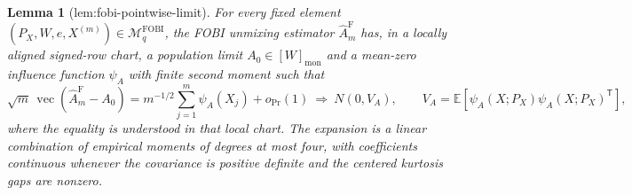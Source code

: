 \documentclass{article}
\newtheorem{lemma}{Lemma}
\begin{document}
\begin{lemma}[lem:fobi-pointwise-limit]\label{lem:fobi-pointwise-limit}
For every fixed element \((P_X,W,e,X^{(m)})\in\mathcal M_q^{\mathrm{FOBI}}\), the FOBI unmixing estimator \(\widehat A_m^{\mathrm F}\) has, in a locally aligned signed-row chart, a population limit \(A_0\in[W]_{\mathrm{mon}}\) and a mean-zero influence function \(\psi_A\) with finite second moment such that
\[
 \sqrt m\,\operatorname{vec}(\widehat A_m^{\mathrm F}-A_0)
 =m^{-1/2}\sum_{j=1}^m\psi_A(X_j)+o_{\Pr}(1)
 \ \Longrightarrow\ N(0,V_A),
 \qquad
 V_A=\mathbb E[\psi_A(X;P_X)\psi_A(X;P_X)^{\mathsf T}],
\]
where the equality is understood in that local chart. The expansion is a linear combination of empirical moments of degrees at most four, with coefficients continuous whenever the covariance is positive definite and the centered kurtosis gaps are nonzero.
\end{lemma}
\end{document}
